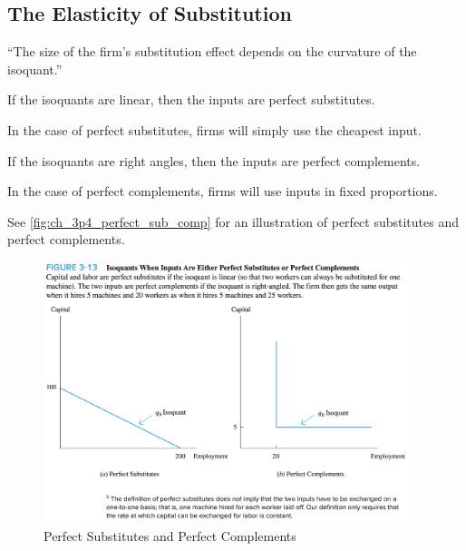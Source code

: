 
\subsection{The Elasticity of Substitution}


``The size of the firm's substitution effect depends on the curvature of the isoquant.''

\begin{definition}
    
    If the isoquants are linear, 
    then the inputs are perfect substitutes.

\end{definition}

In the case of perfect substitutes, 
firms will simply use the cheapest input.

\begin{definition}
    
    If the isoquants are right angles, 
    then the inputs are perfect complements.
    
\end{definition}

In the case of perfect complements,
firms will use inputs in fixed proportions.

See \autoref{fig:ch_3p4_perfect_sub_comp}
for an illustration of perfect substitutes
and perfect complements.

\FloatBarrier

\begin{figure}[!htb]
    \centering
        \includegraphics[width=0.95\textwidth]{../input/ch_3p4_perfect_sub_comp.png}
    \caption{Perfect Substitutes and Perfect Complements}
    \label{fig:ch_3p4_perfect_sub_comp}
\end{figure}

